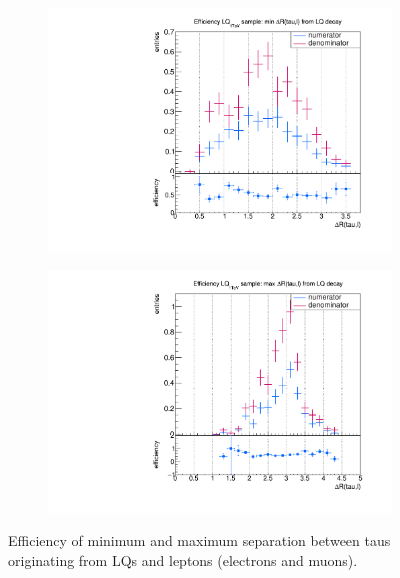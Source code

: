 \begin{figure}
\begin{subfigure}[t]{0.49\textwidth}
                \label{dRFromLQ:signal:taulepton:maxLQ75}
                \end{subfigure}
                \begin{subfigure}[t]{0.49\textwidth}
                \includegraphics[width=\textwidth]{figures/plots/LQ76/Divided_fromLQ_mindR_taulepton.pdf}
                \label{dRFromLQ:signal:taulepton:minLQ76}
                \end{subfigure}
                \begin{subfigure}[t]{0.49\textwidth}
                \includegraphics[width=\textwidth]{figures/plots/LQ76/Divided_maxdR_fromLQ_taulepton.pdf}
                \label{dRFromLQ:signal:taulepton:maxLQ76}
                \end{subfigure}
\caption[Efficiency of separation between taus originating from LQs and leptons.]{Efficiency of minimum and maximum separation between taus originating from LQs and leptons (electrons and muons).}
\label{dRFromLQ:signal:taulepton}
\end{figure}
